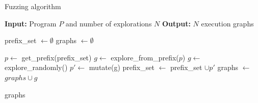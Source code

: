 \begin{algorithm}
    \caption{Fuzzing algorithm}
    \label{fuzzer}
    \begin{algorithmic}[1]
    \STATE \textbf{Input:} Program $P$ and number of explorations $N$ \label{line:input}
    \STATE \textbf{Output:} $N$ execution graphs
    
    \STATE prefix\_set $\leftarrow \emptyset$ \label{line:init_prefix}
    \STATE graphs $\leftarrow \emptyset$ 
    
            \STATE $p \leftarrow$ get\_prefix(prefix\_set) \label{line:pick_prefix}
            \STATE $g \leftarrow $ explore\_from\_prefix($p$) \label{line:explore_prefix}
        \ELSE 
            \STATE $g \leftarrow $ explore\_randomly() \label{line:random_explore}
        \ENDIF 
         \label{line:is_interesting}
            \STATE $p' \leftarrow$ mutate(g) \label{line:mutate}
            \STATE prefix\_set $\leftarrow$ prefix\_set $\cup p'$      \label{line:add_prefix}  
        \ENDIF
        \STATE graphs $\leftarrow$ $graphs \cup g$      \label{line:add_graph}
    \ENDFOR
    
    \RETURN graphs      \label{line:output}
    \end{algorithmic}
\end{algorithm}











